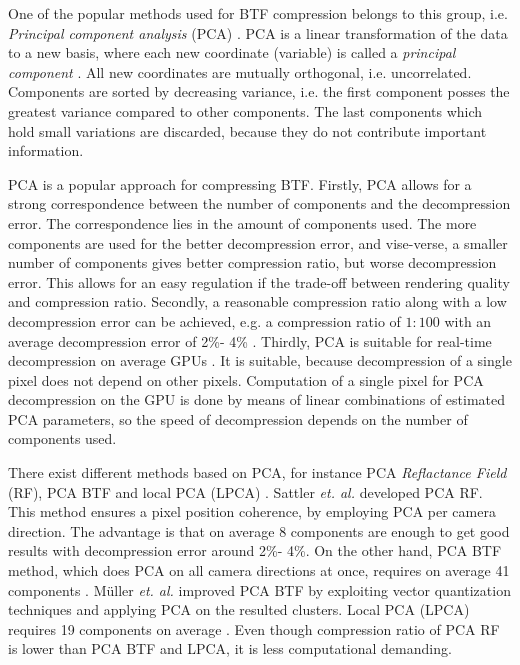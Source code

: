 One of the popular methods used for BTF compression belongs to this group, i.e. \emph{Principal component analysis} (PCA) \cite{Bishop,schneider2004,haindl,webglbtfstreaming,sattler-2003-efficient,mueller-2003-compression,gpu_gems}.
PCA is a linear transformation of the data to a new basis, where each new coordinate (variable) is called a \emph{principal component} \cite{Bishop}.
All new coordinates are mutually orthogonal, i.e. uncorrelated. Components are sorted by decreasing variance, i.e. the first component posses the greatest variance compared to other components. 
 The last components which hold small variations are discarded, because they do not contribute important information.

PCA is a popular approach for compressing BTF. 
Firstly, PCA allows for a strong correspondence between the number of components and the decompression error.
 The correspondence lies in the amount of components used.
 The more components are used for the better decompression error, and vise-verse, a smaller number of components gives better compression ratio, but worse decompression error.
 This allows for an easy  regulation if the trade-off between rendering quality and  compression ratio.
Secondly, a reasonable compression ratio along with a low decompression error can be achieved, e.g. a compression ratio of $1:100$ with an average decompression error of 2\%- 4\% \cite{schneider2004,haindl}.
Thirdly, PCA is suitable for real-time decompression on average GPUs \cite{schneider2004,haindl}. 
It is suitable, because decompression of a single pixel does not depend on other pixels.
 Computation of a single pixel for PCA decompression on the GPU is done by means of linear combinations of estimated PCA parameters, so the speed of decompression depends on the number of components used.
 
 There exist different methods based on PCA, for instance PCA \emph{Reflactance Field} (RF), PCA BTF and local PCA (LPCA) \cite{sattler-2003-efficient,schneider2004,mueller-2003-compression, haindl}.
 Sattler \emph{et. al.} \cite{sattler-2003-efficient} developed PCA RF. 
 This method ensures a pixel position coherence, by employing PCA per camera direction. 
 The advantage is that on average 8 components are enough to get good results with decompression error around  2\%- 4\%.
 On the other hand, PCA BTF method, which does PCA on all camera directions at once, requires on average 41 components \cite{haindl}.
 M{\"u}ller  \emph{et. al.} \cite{schneider2004} improved PCA BTF by exploiting vector quantization techniques and applying PCA on the resulted clusters.
Local PCA (LPCA) requires 19 components on average \cite{haindl}.
 Even though compression ratio of PCA RF is lower than PCA BTF and LPCA, it is less computational demanding.



